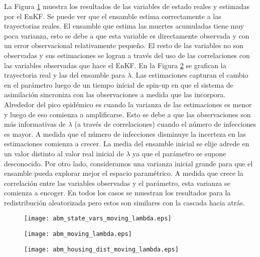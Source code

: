 La Figura \ref{fig:abm_state_vars_moving_lambda} muestra los resultados de las variables de estado reales y estimadas por el EnKF. Se puede ver que el ensamble estima correctamente a las trayectorias reales. El ensamble que estima las muertes acumuladas tiene muy poca varianza, esto se debe a que esta variable es directamente observada y con un error observacional relativamente pequeño. El resto de las variables no son observadas y sus estimaciones se logran a través del uso de las correlaciones con las variables observadas que hace el EnKF. En la Figura \ref{fig:abm_moving_lambda} se grafican la trayectoria real y las del ensamble para $\lambda$. Las estimaciones capturan el cambio en el parámetro luego de un tiempo inicial de spin-up en que el sistema de asimilación sincroniza con las observaciones a medida que las incorpora. Alrededor del pico epidémico es cuando la varianza de las estimaciones es menor y luego de eso comienza a amplificarse. Esto se debe a que las observaciones son más informativas de $\lambda$ (a través de correlaciones) cuando el número de infecciones es mayor. A medida que el número de infecciones disminuye la incerteza en las estimaciones comienza a crecer. La media del ensamble inicial se elije adrede en un valor distinto al valor real inicial de $\lambda$ ya que el parámetro se supone desconocido. Por otro lado, consideramos una varianza inicial grande para que el ensamble pueda explorar mejor el espacio paramétrico. A medida que crece la correlación entre las variables observadas y el parámetro, esta varianza se comienza a encoger. En todos los casos se muestran los resultados para la redistribución aleatorizada pero estos son similares con la cascada hacia atrás.
\begin{figure}[h!]
    \centering
    \texttt{[image: abm\_state\_vars\_moving\_lambda.eps]}
    \caption{}
    \label{fig:abm_state_vars_moving_lambda}
\end{figure}
\begin{figure}[h!]
    \centering
    \texttt{[image: abm\_moving\_lambda.eps]}
    \caption{}
    \label{fig:abm_moving_lambda}
\end{figure}
\begin{figure}[h!]
    \centering
    \texttt{[image: abm\_housing\_dist\_moving\_lambda.eps]}
    \caption{}
    \label{fig:abm_housing_dist_moving_lambda}
\end{figure}

